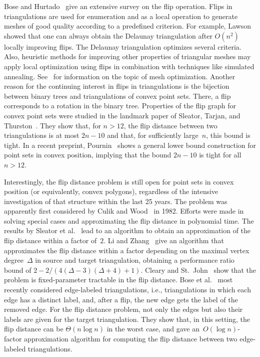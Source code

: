 \documentclass[11pt,a4paper]{article}
\begin{document}
Bose and Hurtado~\cite{survey} give an extensive survey on the flip operation.
Flips in triangulations are used for enumeration and as a local operation to generate meshes of good quality according to a predefined criterion.
For example, Lawson~\cite{lawson_delaunay} showed that one can always obtain the Delaunay triangulation after $O(n^2)$ locally improving flips.
The Delaunay triangulation optimizes several criteria.
Also, heuristic methods for improving other properties of triangular meshes may apply local optimization using flips in combination with techniques like simulated annealing.
See~\cite{bern_eppstein,hjelle} for information on the topic of mesh optimization.
Another reason for the continuing interest in flips in triangulations is the bijection between binary trees and triangulations of convex point sets.
There, a flip corresponds to a rotation in the binary tree.
Properties of the flip graph for convex point sets were studied in the landmark paper of Sleator, Tarjan, and Thurston~\cite{sleator}.
They show that, for $n > 12$, the flip distance between two triangulations is at most $2n-10$ and that, for sufficiently large~$n$, this bound is tight.
In a recent preprint, Pournin~\cite{pournin} shows a general lower bound construction for point sets in convex position, implying that the bound $2n-10$ is tight for all $n > 12$.

Interestingly, the flip distance problem is still open for point sets in convex position (or equivalently, convex polygons), regardless of the intensive investigation of that structure within the last 25 years.
The problem was apparently first considered by Culik and Wood~\cite{tree_similarity} in 1982.
Efforts were made in solving special cases and approximating the flip distance in polynomial time.
The results by Sleator et al.~\cite{sleator} lead to an algorithm to obtain an approximation of the flip distance within a factor of~$2$.
Li and Zhang~\cite{convex_approx_diagonals} give an algorithm that approximates the flip distance within a factor depending on the maximal vertex degree~$\Delta$ in source and target triangulation, obtaining a performance ratio bound of $2 - 2/(4(\Delta-3)(\Delta+4)+1)$.
Cleary and St.~John~\cite{fpt_convex_flips} show that the problem is fixed-parameter tractable in the flip distance.
Bose et al.~\cite{edge_labelled_triangulations} most recently considered edge-labeled triangulations, i.e., triangulations in which each edge has a distinct label, and, after a flip, the new edge gets the label of the removed edge.
For the flip distance problem, not only the edges but also their labels are given for the target triangulation.
They show that, in this setting, the flip distance can be $\Theta(n \log n)$ in the worst case, and gave an~$O(\log n)$-factor approximation algorithm for computing the flip distance between two edge-labeled triangulations.
\end{document}
